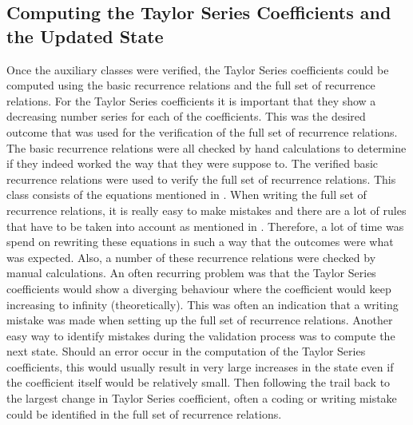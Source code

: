 \subsection{Computing the Taylor Series Coefficients and the Updated State}
\label{subsec:TaySerCoefverval}
Once the auxiliary classes were verified, the Taylor Series coefficients could be computed using the basic recurrence relations and the full set of recurrence relations. For the Taylor Series coefficients it is important that they show a decreasing number series for each of the coefficients. This was the desired outcome that was used for the verification of the full set of recurrence relations. The basic recurrence relations were all checked by hand calculations to determine if they indeed worked the way that they were suppose to. The verified basic recurrence relations were used to verify the full set of recurrence relations. This class consists of the equations mentioned in . When writing the full set of recurrence relations, it is really easy to make mistakes and there are a lot of rules that have to be taken into account as mentioned in . Therefore, a lot of time was spend on rewriting these equations in such a way that the outcomes were what was expected. Also, a number of these recurrence relations were checked by manual calculations. An often recurring problem was that the Taylor Series coefficients would show a diverging behaviour where the coefficient would keep increasing to infinity (theoretically). This was often an indication that a writing mistake was made when setting up the full set of recurrence relations. Another easy way to identify mistakes during the validation process was to compute the next state. Should an error occur in the computation of the Taylor Series coefficients, this would usually result in very large increases in the state even if the coefficient itself would be relatively small. Then following the trail back to the largest change in Taylor Series coefficient, often a coding or writing mistake could be identified in the full set of recurrence relations. 

